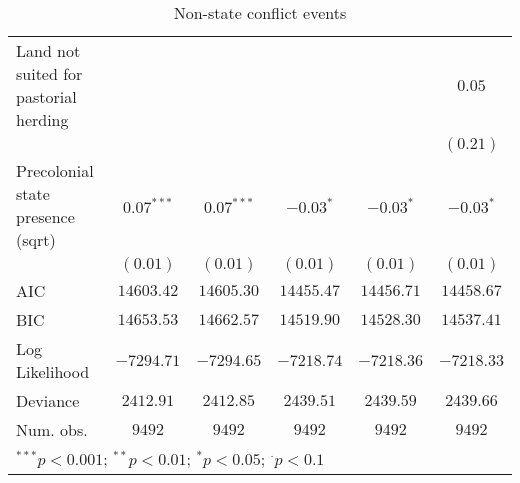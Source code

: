 \begin{sidewaystable}
\begin{center}
{\begin{tabular}{l c c c c c}
Land not suited for pastorial herding &               &               &               &               & $0.05$        \\
                                      &               &               &               &               & $(0.21)$      \\
Precolonial state presence (sqrt)     & $0.07^{***}$  & $0.07^{***}$  & $-0.03^{*}$   & $-0.03^{*}$   & $-0.03^{*}$   \\
                                      & $(0.01)$      & $(0.01)$      & $(0.01)$      & $(0.01)$      & $(0.01)$      \\
\midrule
AIC                                   & $14603.42$    & $14605.30$    & $14455.47$    & $14456.71$    & $14458.67$    \\
BIC                                   & $14653.53$    & $14662.57$    & $14519.90$    & $14528.30$    & $14537.41$    \\
Log Likelihood                        & $-7294.71$    & $-7294.65$    & $-7218.74$    & $-7218.36$    & $-7218.33$    \\
Deviance                              & $2412.91$     & $2412.85$     & $2439.51$     & $2439.59$     & $2439.66$     \\
Num. obs.                             & $9492$        & $9492$        & $9492$        & $9492$        & $9492$        \\
\bottomrule
\multicolumn{6}{l}{\scriptsize{$^{***}p<0.001$; $^{**}p<0.01$; $^{*}p<0.05$; $^{\cdot}p<0.1$}}
\end{tabular}
}
\caption{Non-state conflict events}
\label{non_state}
\end{center}
\end{sidewaystable}

